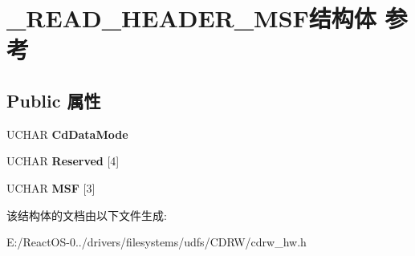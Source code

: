 \hypertarget{struct___r_e_a_d___h_e_a_d_e_r___m_s_f}{}\section{\+\_\+\+R\+E\+A\+D\+\_\+\+H\+E\+A\+D\+E\+R\+\_\+\+M\+S\+F结构体 参考}
\label{struct___r_e_a_d___h_e_a_d_e_r___m_s_f}
\subsection*{Public 属性}
\begin{DoxyCompactItemize}
\item 
\mbox{\label{struct___r_e_a_d___h_e_a_d_e_r___m_s_f_a61a7cbd5486d4f77013768401a71de88}} 
U\+C\+H\+AR {\bfseries Cd\+Data\+Mode}
\item 
\mbox{\label{struct___r_e_a_d___h_e_a_d_e_r___m_s_f_a8d6479298ac36833e58eac58185a31df}} 
U\+C\+H\+AR {\bfseries Reserved} \mbox{[}4\mbox{]}
\item 
\mbox{\label{struct___r_e_a_d___h_e_a_d_e_r___m_s_f_adc14687388ac590bde1d044abf346754}} 
U\+C\+H\+AR {\bfseries M\+SF} \mbox{[}3\mbox{]}
\end{DoxyCompactItemize}


该结构体的文档由以下文件生成\+:\begin{DoxyCompactItemize}
\item 
E\+:/\+React\+O\+S-\/0../drivers/filesystems/udfs/\+C\+D\+R\+W/cdrw\+\_\+hw.\+h\end{DoxyCompactItemize}
